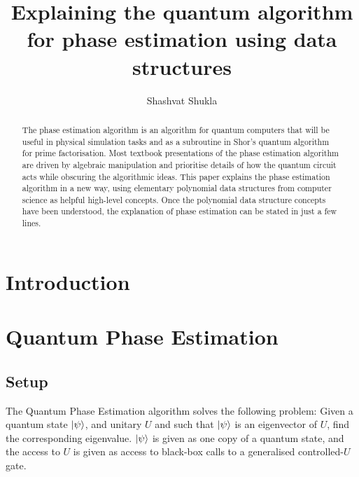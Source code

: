 \documentclass[12pt, a4paper]{article}
\title{Explaining the quantum algorithm for phase estimation using data structures}
\author{Shashvat Shukla}
\begin{document}
	
	\maketitle
	
	\begin{abstract}
		The phase estimation algorithm is an algorithm for quantum computers that will be useful in physical simulation tasks and as a subroutine in Shor's quantum algorithm for prime factorisation. 
		Most textbook presentations of the phase estimation algorithm are driven by algebraic manipulation and prioritise details of how the quantum circuit acts while obscuring the algorithmic ideas.
		This paper explains the phase estimation algorithm in a new way, using elementary polynomial data structures from computer science as helpful high-level concepts. 
		Once the polynomial data structure concepts have been understood, the explanation of phase estimation can be stated in just a few lines.
	\end{abstract}

	\section{Introduction}
	
	\section{Quantum Phase Estimation}
	\label{sec:qpe}
	
	\subsection{Setup}
	The Quantum Phase Estimation algorithm solves the following problem: Given a quantum state $\ket{\psi}$, and unitary $U$ and such that $\ket{\psi}$ is an eigenvector of $U$, find the corresponding eigenvalue. $\ket{\psi}$ is given as one copy of a quantum state, and the access to $U$ is given as access to black-box calls to a generalised controlled-$U$ gate. 
	
\end{document}
